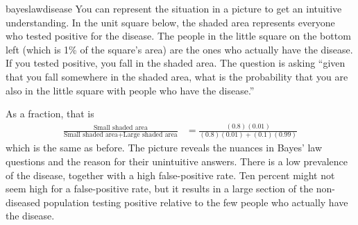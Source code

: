 \begin{answer}{bayeslawdisease}
You can represent the situation in a picture to get an intuitive understanding.
In the unit square below, the shaded area represents everyone who tested positive for the disease.
The people in the little square on the bottom left (which is 1\% of the square's area) are the ones who actually have the disease.
If you tested positive, you fall in the shaded area.
The question is asking ``given that you fall somewhere in the shaded area, what is the probability that you are also in the little square with people who have the disease.''
\begin{center}


\end{center}
As a fraction, that is
\begin{align*}
\frac{ \text{Small shaded area} }{ \text{Small shaded area}+\text{Large shaded area} }
&= \frac{ (0.8)(0.01) }{ (0.8)(0.01) + (0.1)(0.99)  }
\end{align*}
which is the same as before.
The picture reveals the nuances in Bayes' law questions and the reason for their unintuitive answers.
There is a low prevalence of the disease, together with a high false-positive rate.
Ten percent might not seem high for a false-positive rate, but it results in a large section of the non-diseased population testing positive relative to the few people who actually have the disease.



\end{answer}
